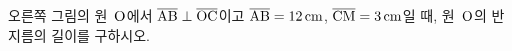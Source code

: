 \noindent\begin{minipage}[t]{0.58\linewidth}\vspace{0pt}\raggedright 오른쪽 그림의 원~$\mathrm{O}$에서 $\overline{\mathrm{AB}}\perp\overline{\mathrm{OC}}$이고 $\overline{\mathrm{AB}}=12\,\mathrm{cm}$, $\overline{\mathrm{CM}}=3\,\mathrm{cm}$일 때, 원~$\mathrm{O}$의 반지름의 길이를 구하시오.\end{minipage}\hfill\begin{minipage}[t]{0.4\linewidth}\vspace{0pt}\centering \resizebox{\ifdim\width>\linewidth\linewidth\else\width\fi}{!}{}\end{minipage}\par
